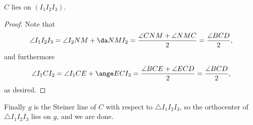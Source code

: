 \begin{iclaim}
    $C$ lies on $(I_1I_2I_3)$.
\end{iclaim}
\begin{proof}
    Note that \[\angle I_1I_2I_3=\angle I_2NM+\da NMI_2=\frac{\angle CNM+\angle NMC}2=\frac{\angle BCD}2,\]
    and furthermore \[\angle I_1CI_2=\angle I_1CE+\ange ECI_3=\frac{\angle BCE+\angle ECD}2=\frac{\angle BCD}2,\]
    as desired.
\end{proof}

Finally $g$ is the Steiner line of $C$ with respect to $\triangle I_1I_2I_3$, so the orthocenter of $\triangle I_1I_2I_3$ lies on $g$, and we are done.

